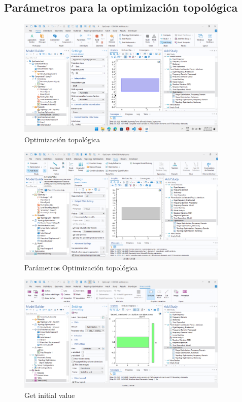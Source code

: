 \documentclass{article}
\theoremstyle{mytheoremstyle}
\theoremstyle{mytheoremstyle}
\theoremstyle{myproblemstyle}
\begin{document}
            \subsection{Parámetros para la optimización topológica}
             \begin{figure}[H]
              \centering
              \includegraphics[width=0.9\textwidth]{opt.png}
              \caption{Optimización topológica}
              \label{fig:comsol_opt_topo}
            \end{figure}
              \begin{figure}[H]
              \centering
              \includegraphics[width=0.9\textwidth]{Param.png}
              \caption{Parámetros Optimización topológica}
              \label{fig:comsol_opt_params}
            \end{figure}
            \begin{figure}[H]
              \centering
              \includegraphics[width=0.9\textwidth]{initi.png}
              \caption{Get initial value}
              \label{fig:comsol_opt_initial}
            \end{figure}
\end{document}
